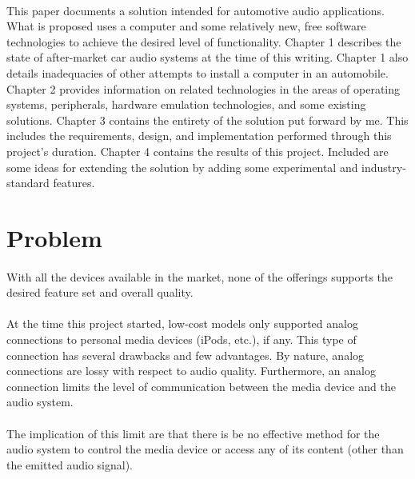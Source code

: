 \paragraph{}
This paper documents a solution intended for automotive audio applications.
What is proposed uses a computer and some relatively new, free software technologies to achieve the desired level of functionality.
Chapter 1 describes the state of after-market car audio systems at the time of this writing.
Chapter 1 also details inadequacies of other attempts to install a computer in an automobile.
Chapter 2 provides information on related technologies in the areas of operating systems, peripherals, hardware emulation technologies, and some existing solutions.
Chapter 3 contains the entirety of the solution put forward by me.
This includes the requirements, design, and implementation performed through this project's duration.
Chapter 4 contains the results of this project.
Included are some ideas for extending the solution by adding some experimental and industry-standard features.

\section{Problem}

\paragraph{}
With all the devices available in the market, none of the offerings supports the desired feature set and overall quality.

\paragraph{}
At the time this project started, low-cost models only supported analog connections to personal media devices (iPods, etc.), if any.
This type of connection has several drawbacks and few advantages.
By nature, analog connections are lossy with respect to audio quality.
Furthermore, an analog connection limits the level of communication between the media device and the audio system.

\paragraph{}
The implication of this limit are that there is be no effective method for the audio system to control the media device or access any of its content (other than the emitted audio signal).

